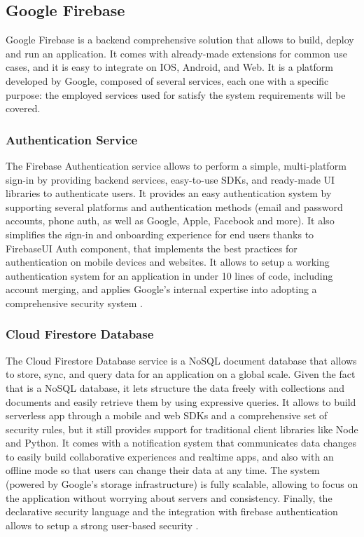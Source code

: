 \subsection{Google Firebase}
Google Firebase is a backend comprehensive solution that allows to build, deploy and run an application. It comes with already-made extensions for common use cases, and it is easy to integrate on IOS, Android, and Web. It is a platform developed by Google, composed of several services, each one with a specific purpose: the employed services used for satisfy the system requirements will be covered.
\subsubsection{Authentication Service}
\label{subsubsec:authenticationService}
The Firebase Authentication service allows to perform a simple, multi-platform sign-in by providing backend services, easy-to-use SDKs, and ready-made UI libraries to authenticate users. It provides an easy authentication system by supporting several platforms and authentication methods (email and password accounts, phone auth, as well as Google, Apple, Facebook and more). It also simplifies the sign-in and onboarding experience for end users thanks to FirebaseUI Auth component, that implements the best practices for authentication on mobile devices and websites. It allows to setup a working authentication system for an application in under 10 lines of code, including account merging, and applies Google's internal expertise into adopting a comprehensive security system \cite{FirebaseAuthentication}.
\subsubsection{Cloud Firestore Database}
The Cloud Firestore Database service is a NoSQL document database that allows to store, sync, and query data for an application on a global scale. Given the fact that is a NoSQL database, it lets structure the data freely with collections and documents and easily retrieve them by using expressive queries. It allows to build serverless app through a mobile and web SDKs and a comprehensive set of security rules, but it still provides support for traditional client libraries like Node and Python. It comes with a notification system that communicates data changes to easily build collaborative experiences and realtime apps, and also with an offline mode so that users can change their data at any time. The system (powered by Google's storage infrastructure) is fully scalable, allowing to focus on the application without worrying about servers and consistency. Finally, the declarative security language and the integration with firebase authentication allows to setup a strong user-based security \cite{CloudFirestore}.
